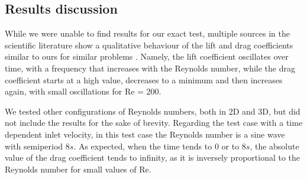 \subsection{Results discussion}
While we were unable to find results for our exact test, multiple sources in the scientific literature show a qualitative behaviour of the lift and drag coefficients similar to ours for similar problems \cite{lift_drag}\cite{lift_drag_2}\cite{lift_drag_3}. Namely, the lift coefficient oscillates over time, with a frequency that increases with the Reynolds number, while the drag coefficient starts at a high value, decreases to a minimum and then increases again, with small oscillations for Re = 200.

We tested other configurations of Reynolds numbers, both in 2D and 3D, but did not include the results for the sake of brevity. Regarding the test case with a time dependent inlet velocity, in this test case the Reynolds number is a sine wave with semiperiod $8s$. As expected, when the time tends to $0$ or to $8s$, the absolute value of the drag coefficient tends to infinity, as it is inversely proportional to the Reynolds number for small values of Re.